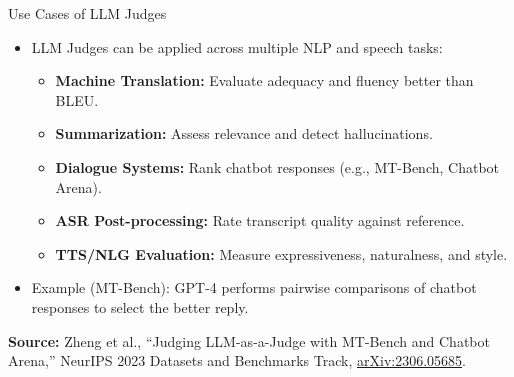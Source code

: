 \begin{frame}[allowframebreaks]{Use Cases of LLM Judges}

\begin{itemize}
    \item LLM Judges can be applied across multiple NLP and speech tasks:

    \begin{itemize}
        \item \textbf{Machine Translation:} Evaluate adequacy and fluency better than BLEU.  
        \item \textbf{Summarization:} Assess relevance and detect hallucinations.  
        \item \textbf{Dialogue Systems:} Rank chatbot responses (e.g., MT-Bench, Chatbot Arena).  
        \item \textbf{ASR Post-processing:} Rate transcript quality against reference.  
        \item \textbf{TTS/NLG Evaluation:} Measure expressiveness, naturalness, and style.
    \end{itemize}

    \item Example (MT-Bench): GPT-4 performs pairwise comparisons of chatbot responses to select the better reply.
\end{itemize}

\vspace{0.3em}
{\scriptsize \textbf{Source:} Zheng et al., ``Judging LLM-as-a-Judge with MT-Bench and Chatbot Arena,'' NeurIPS 2023 Datasets and Benchmarks Track, \href{https://arxiv.org/abs/2306.05685}{arXiv:2306.05685}.}

\end{frame}


